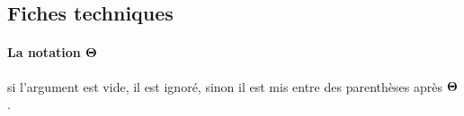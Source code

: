 \documentclass[12pt,a4paper]{article}
\begin{document}


\subsection{Fiches techniques}

\paragraph{\texorpdfstring{La notation $\bigtheta{}$}%
                          {La notation "grand Theta"}}


\IDarg{} si l'argument est vide, il est ignoré, sinon il est mis entre des parenthèses après $\bigtheta{}$.
\end{document}
